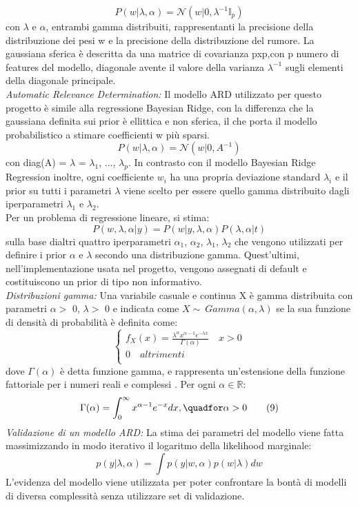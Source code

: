 \documentclass[10pt,journal,compsoc]{IEEEtran}
\begin{document}
\[P(w|\lambda,\alpha) = \mathcal{N}(w|0,\lambda^{-1}\mathbb{I}_p) \tag{5}\]
con  \(\lambda\) e \(\alpha\), entrambi gamma distribuiti, rappresentanti la precisione della distribuzione dei pesi w e la precisione della distribuzione del rumore. La gaussiana sferica è descritta da una matrice di covarianza pxp,con p numero di features del modello, diagonale avente il valore della varianza \(\lambda^{-1}\) sugli elementi della diagonale principale.\\
\emph{Automatic Relevance Determination:} Il modello ARD utilizzato per questo progetto è simile alla regressione Bayesian Ridge, con la differenza che la gaussiana definita sui prior è ellittica e non sferica, il che porta il modello probabilistico a stimare coefficienti w più sparsi.
\[P(w|\lambda,\alpha) = \mathcal{N}(w|0,A^{-1}) \tag{6}\]
con diag(A) = \(\lambda\) = {\(\lambda_1\), ..., \(\lambda_p\)}.
In contrasto con il modello Bayesian Ridge Regression inoltre, ogni coefficiente \(w_i\) ha una propria deviazione standard \(\lambda_i\) e il prior su tutti i parametri \(\lambda\) viene scelto per essere quello gamma distribuito dagli iperparametri \(\lambda_1\) e \(\lambda_2\).\\
Per un problema di regressione lineare, si stima:
\[P(w,\lambda,\alpha|y) = P(w|y,\lambda,\alpha) P(\lambda,\alpha|t) \tag{7}\]
sulla base dialtri quattro iperparametri \(\alpha_1\), \(\alpha_2\), \(\lambda_1\), \(\lambda_2\) che vengono utilizzati per definire i prior \(\alpha\) e \(\lambda\) secondo una distribuzione gamma. Quest'ultimi, nell'implementazione usata nel progetto, vengono assegnati di default e costituiscono un prior di tipo non informativo.\\
\emph{Distribuzioni gamma:}
Una variabile casuale e continua X è gamma distribuita con parametri \(\alpha >\) 0, \(\lambda >\) 0 e indicata come \(X \sim\ Gamma(\alpha,\lambda)\) se la sua funzione di densità di probabilità è definita come:
\[\begin{cases}
f_X(x) = \frac{\lambda^\alpha x^{\alpha-1} e^{-\lambda x}}{\Gamma(\alpha)}\quad x > 0\\
0\quad altrimenti\\
\end{cases}
 \tag{8}\]
dove \(\Gamma(\alpha)\) è detta funzione gamma, e rappresenta un'estensione della funzione fattoriale per i numeri reali e complessi \cite{gammadist}. Per ogni \(\alpha \in \mathbb{R}\):
\[\Gamma(\alpha) = \int_{0}^{\infty} x^{\alpha-1}e^{-x} dx,\quadfor \alpha > 0 \tag{9}\]
\emph{Validazione di un modello ARD:}
La stima dei parametri del modello viene fatta massimizzando in modo iterativo il logaritmo della likelihood marginale:
\[p(y|\lambda,\alpha) = \int p(y|w,\alpha) p(w|\lambda)dw \tag{10}\]
L'evidenza del modello viene utilizzata per poter confrontare la bontà di modelli di diversa complessità senza utilizzare set di validazione.
\newpage
\end{document}
